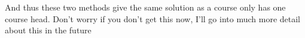 \documentclass[preview]{standalone}
\begin{document}
\begin{flushleft}
And thus these two methods give the same solution as a course only has one course head. Don't worry if you don't get this now, I'll go into much more detail about this in the future
\end{flushleft}
\end{document}
